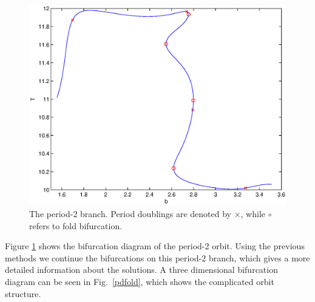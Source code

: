 \documentclass[10pt,a4paper]{ddedoc}
\begin{document}
%
\begin{figure}
\begin{center}
\includegraphics[scale=0.6]{fig/pdsw.eps}
\end{center}
\caption{The period-2 branch. Period doublings are denoted by $\times$, while $\circ$ refers to fold bifurcation. }
\label{pdsw}
\end{figure}
Figure \ref{pdsw} shows the bifurcation diagram of the period-2 orbit. Using the previous methods we continue the bifurcations on this period-2 branch, which gives a more detailed information about the solutions. A three dimensional bifurcation diagram can be seen in Fig.\ \ref{pdfold}, which shows the complicated orbit structure.
\end{document}
